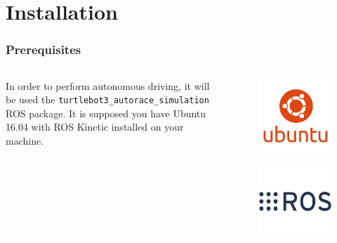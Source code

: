 \section{Installation}


\begin{frame}
\frametitle{Prerequisites}
\begin{columns}
\begin{column}{0.5\textwidth}
	In order to perform autonomous driving, it will be used the \texttt{turtlebot3\_autorace\_simulation} ROS package.
	It is supposed you have Ubuntu 16.04 with ROS Kinetic installed on your machine.
\end{column}
\begin{column}{0.5\textwidth}
	\begin{figure}
		\includegraphics[height=0.3\textheight]{figures/png/ubuntulogo}
	\end{figure}
	\begin{figure}
		\includegraphics[height=0.3\textheight]{figures/png/roslogo}
	\end{figure}
\end{column}
\end{columns}
\end{frame}

